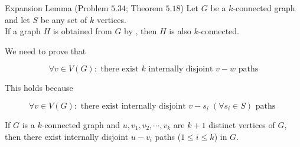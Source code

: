 
\begin{frame}{}
  \begin{exampleblock}{Expansion Lemma (Problem $5.34$; Theorem $5.18$)}
    Let $G$ be a $k$-connected graph and let $S$ be any set of $k$ vertices. \\[8pt]
    If a graph $H$ is obtained from $G$ by ,
    then $H$ is also $k$-connected.
  \end{exampleblock}

  \vspace{0.80cm}
\end{frame}

\begin{frame}{}

  \begin{center}
    We need to prove that
  \end{center}
  \[
    \forall v \in V(G): \text{ there exist $k$ internally disjoint $v-w$ paths}
  \]


  \pause
  \begin{center}
    This holds because
  \end{center}
  \[
    \forall v \in V(G): \text{ there exist internally disjoint $v-s_i\; (\forall s_i \in S)$ paths }
  \]

  \pause
  \begin{corollary}
    If $G$ is a $k$-connected graph and $u, v_1, v_2, \cdots, v_k$ are $k+1$ distinct vertices of $G$,
    then there exist internally disjoint $u-v_i$ paths ($1 \le i \le k$) in $G$.
  \end{corollary}
\end{frame}

